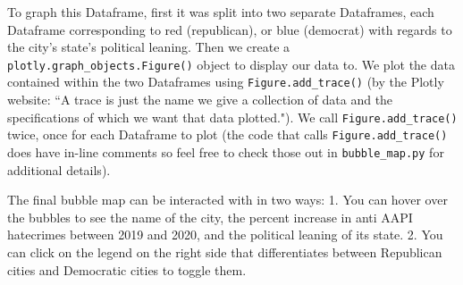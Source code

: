 \documentclass[fontsize=11pt]{article}
\begin{document}
    To graph this Dataframe, first it was split into two separate Dataframes, each Dataframe corresponding to red (republican), or blue (democrat) with regards to the city's state's political leaning. Then we create a \newline \texttt{plotly.graph\_objects.Figure()} object to display our data to. We plot the data contained within the two Dataframes using \texttt{Figure.add\_trace()} (by the Plotly website: “A trace is just the name we give a collection of data and the specifications of which we want that data plotted."). We call \texttt{Figure.add\_trace()} twice, once for each Dataframe to plot (the code that calls \texttt{Figure.add\_trace()} does have in-line comments so feel free to check those out in \texttt{bubble\_map.py} for additional details).

    The final bubble map can be interacted with in two ways:
    1. You can hover over the bubbles to see the name of the city, the percent increase in anti AAPI hatecrimes between 2019 and 2020, and the political leaning of its state.
    2. You can click on the legend on the right side that differentiates between Republican cities and Democratic cities to toggle them. \\
\end{document}
